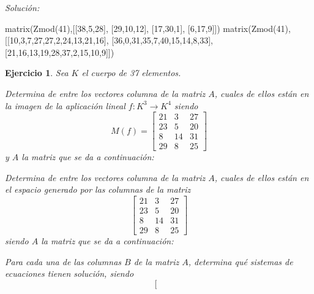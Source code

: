 \documentclass[12pt]{amsart}
\newtheorem{ejer}{Ejercicio}
\begin{document}
{\it Soluci\'on:}

\begin{sageblock}
matrix(Zmod(41),[[38,5,28],
[29,10,12],
[17,30,1],
[6,17,9]])
matrix(Zmod(41),[[10,3,7,27,27,2,24,13,21,16],
[36,0,31,35,7,40,15,14,8,33],
[21,16,13,19,28,37,2,15,10,9]])
\end{sageblock}



\begin{ejer} Sea $K$ el cuerpo de 37 elementos.
\newline
\noindent\begin{minipage}{\textwidth}
\begin{tcolorbox}[colback = green!20!white,title=Versión Núcleo]
Determina de entre los vectores columna de la matriz $A$, cuales de ellos están en la imagen de la aplicación lineal $f:K^{3} \to K^{4}$ siendo  $$ M(f) = \left[\begin{array}{rrr}
21 & 3 & 27 \\
23 & 5 & 20 \\
8 & 14 & 31 \\
29 & 8 & 25
\end{array}\right] $$ y $A$ la matriz que se da a continuación:\end{tcolorbox}
\end{minipage} \newline
\noindent\begin{minipage}{\textwidth}
\begin{tcolorbox}[colback = blue!20!white,title=Versión Anulador]
Determina de entre los vectores columna de la matriz $A$, cuales de ellos están en el espacio generado por las columnas de la matriz $$ \left[\begin{array}{rrr}
21 & 3 & 27 \\
23 & 5 & 20 \\
8 & 14 & 31 \\
29 & 8 & 25
\end{array}\right] $$ siendo $A$ la matriz que se da a continuación:\end{tcolorbox}
\end{minipage} \newline
\noindent\begin{minipage}{\textwidth} 
\begin{tcolorbox}[colback = red!20!white,title=Versión Ecuaciones Implícitas]
Para cada una de las columnas $B$ de la matriz $A$, determina qué sistemas de ecuaciones tienen solución, siendo $$ \left[\begin{array}{rrr}

\end{array}$$
\end{tcolorbox}
\end{minipage}
\end{ejer}
\end{document}
